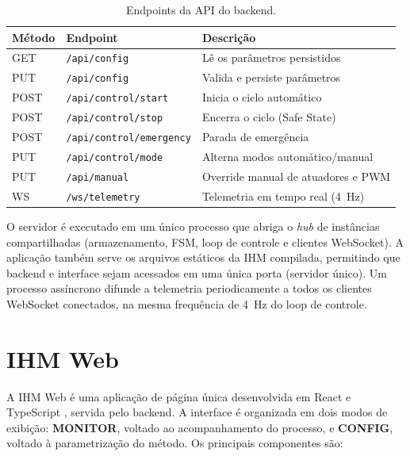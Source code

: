 \begin{table}[htbp]
\centering
\caption{Endpoints da API do backend.}
\label{tab:api}
\begin{tabular}{llp{6.5cm}}
\toprule
\textbf{M\'etodo} & \textbf{Endpoint} & \textbf{Descri\c{c}\~ao} \\
\midrule
GET & \texttt{/api/config} & L\^e os par\^ametros persistidos \\
PUT & \texttt{/api/config} & Valida e persiste par\^ametros \\
POST & \texttt{/api/control/start} & Inicia o ciclo autom\'atico \\
POST & \texttt{/api/control/stop} & Encerra o ciclo (Safe State) \\
POST & \texttt{/api/control/emergency} & Parada de emerg\^encia \\
PUT & \texttt{/api/control/mode} & Alterna modos autom\'atico/manual \\
PUT & \texttt{/api/manual} & Override manual de atuadores e PWM \\
WS & \texttt{/ws/telemetry} & Telemetria em tempo real (4~Hz) \\
\bottomrule
\end{tabular}
\par{}
\end{table}

O servidor \'e executado em um \'unico processo que abriga o \emph{hub} de
inst\^ancias compartilhadas (armazenamento, FSM, loop de controle e clientes
WebSocket). A aplica\c{c}\~ao tamb\'em serve os arquivos est\'aticos da IHM
compilada, permitindo que backend e interface sejam acessados em uma \'unica
porta (servidor \'unico). Um processo ass\'incrono difunde a telemetria
periodicamente a todos os clientes WebSocket conectados, na mesma frequ\^encia de
4~Hz do loop de controle.

\section{IHM Web}

A IHM Web \'e uma aplica\c{c}\~ao de p\'agina \'unica desenvolvida em React e
TypeScript \cite{react}, servida pelo backend. A interface \'e organizada em
dois modos de exibi\c{c}\~ao: \textbf{MONITOR}, voltado ao acompanhamento do
processo, e \textbf{CONFIG}, voltado \`a parametriza\c{c}\~ao do m\'etodo. Os
principais componentes s\~ao:

